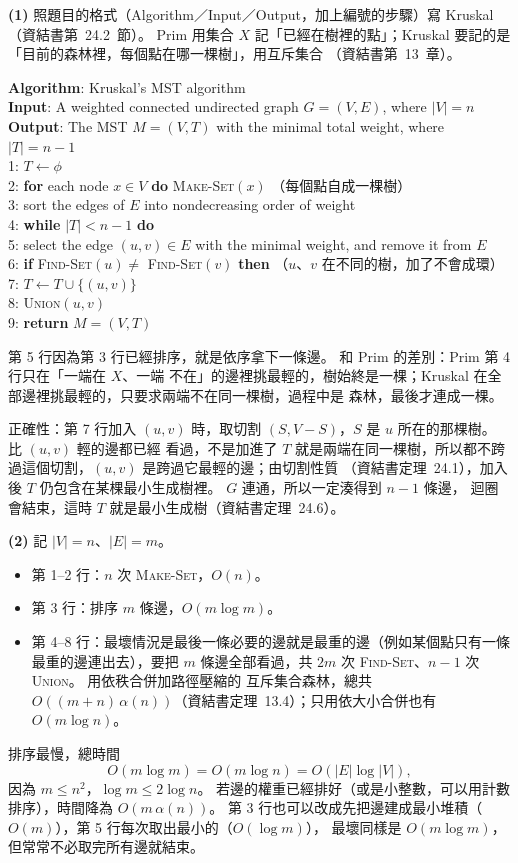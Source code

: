 \begin{pastsoln}
\textbf{(1)} 照題目的格式（Algorithm／Input／Output，加上編號的步驟）寫 Kruskal（資結書第~24.2~節）。
Prim 用集合 $X$ 記「已經在樹裡的點」；Kruskal 要記的是「目前的森林裡，每個點在哪一棵樹」，用互斥集合
（資結書第~13~章）。

\textbf{Algorithm}: Kruskal's MST algorithm\\
\textbf{Input}: A weighted connected undirected graph $G = (V, E)$, where $|V| = n$\\
\textbf{Output}: The MST $M = (V, T)$ with the minimal total weight, where $|T| = n - 1$\\
1: $T \leftarrow \phi$\\
2: \textbf{for} each node $x \in V$ \textbf{do} \textsc{Make-Set}$(x)$ \quad （每個點自成一棵樹）\\
3: sort the edges of $E$ into nondecreasing order of weight\\
4: \textbf{while} $|T| < n - 1$ \textbf{do}\\
5: \quad select the edge $(u, v) \in E$ with the minimal weight, and remove it from $E$\\
6: \quad \textbf{if} \textsc{Find-Set}$(u) \ne$ \textsc{Find-Set}$(v)$ \textbf{then}
\quad （$u$、$v$ 在不同的樹，加了不會成環）\\
7: \quad\quad $T \leftarrow T \cup \{(u, v)\}$\\
8: \quad\quad \textsc{Union}$(u, v)$\\
9: \textbf{return} $M = (V, T)$

第 5 行因為第 3 行已經排序，就是依序拿下一條邊。 和 Prim 的差別：Prim 第 4 行只在「一端在 $X$、一端
不在」的邊裡挑最輕的，樹始終是一棵；Kruskal 在全部邊裡挑最輕的，只要求兩端不在同一棵樹，過程中是
森林，最後才連成一棵。

正確性：第 7 行加入 $(u, v)$ 時，取切割 $(S, V - S)$，$S$ 是 $u$ 所在的那棵樹。 比 $(u, v)$ 輕的邊都已經
看過，不是加進了 $T$ 就是兩端在同一棵樹，所以都不跨過這個切割，$(u, v)$ 是跨過它最輕的邊；由切割性質
（資結書定理~24.1），加入後 $T$ 仍包含在某棵最小生成樹裡。 $G$ 連通，所以一定湊得到 $n - 1$ 條邊，
迴圈會結束，這時 $T$ 就是最小生成樹（資結書定理~24.6）。

\textbf{(2)} 記 $|V| = n$、$|E| = m$。
\begin{itemize}
\item 第 1--2 行：$n$ 次 \textsc{Make-Set}，$O(n)$。
\item 第 3 行：排序 $m$ 條邊，$O(m \log m)$。
\item 第 4--8 行：最壞情況是最後一條必要的邊就是最重的邊（例如某個點只有一條最重的邊連出去），要把
$m$ 條邊全部看過，共 $2m$ 次 \textsc{Find-Set}、$n - 1$ 次 \textsc{Union}。 用依秩合併加路徑壓縮的
互斥集合森林，總共 $O((m + n)\,\alpha(n))$（資結書定理~13.4）；只用依大小合併也有 $O(m \log n)$。
\end{itemize}
排序最慢，總時間
\[
O(m \log m) = O(m \log n) = O(|E| \log |V|),
\]
因為 $m \le n^2$，$\log m \le 2 \log n$。 若邊的權重已經排好（或是小整數，可以用計數排序），時間降為
$O(m\,\alpha(n))$。 第 3 行也可以改成先把邊建成最小堆積（$O(m)$），第 5 行每次取出最小的（$O(\log m)$），
最壞同樣是 $O(m \log m)$，但常常不必取完所有邊就結束。
\end{pastsoln}

